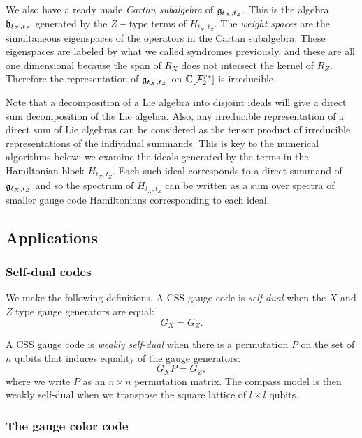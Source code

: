 We also have a ready made \emph{Cartan subalgebra} of $\mathfrak{g}_{t_X,t_Z}.$ 
This is the algebra $\mathfrak{h}_{t_X,t_Z}$ generated by the $Z-$type terms of $H_{t_X,t_Z}.$
The \emph{weight spaces} are the simultaneous eigenspaces
of the operators in the Cartan subalgebra. These
eigenspaces are labeled by what we called syndromes previously,
and these are all one dimensional because the span of $R_X$ does
not intersect the kernel of $R_Z.$
Therefore the representation of 
$\mathfrak{g}_{t_X,t_Z}$ on $\mathbb{C}[\mathcal{F}_2^{r*}]$ is irreducible.

Note that a decomposition of a Lie algebra
into disjoint ideals will give a direct sum decomposition of
the Lie algebra.
Also, any irreducible representation of a direct sum of Lie algebras can
be considered as the tensor product of irreducible representations of the
individual summands.
This is key to the numerical algorithms below:
we examine the ideals generated by
the terms in the Hamiltonian block $H_{t_X,t_Z}.$
Each such ideal corresponds to a direct summand of $\mathfrak{g}_{t_X,t_Z}$ 
and so the spectrum of  $H_{t_X,t_Z}$
can be written as a sum over spectra of smaller gauge code Hamiltonians
corresponding to each ideal.


\subsection{Applications}

\subsubsection{Self-dual codes}

We make the following definitions.
A CSS gauge code is \emph{self-dual} when the $X$ and $Z$ type
gauge generators are equal: $$G_X = G_Z.$$

A CSS gauge code is \emph{weakly self-dual}
when there is a permutation $P$ on the set of $n$ qubits
that induces equality of the gauge generators:
$$
    G_X P = G_Z,
$$
where we write $P$ as an $n\times n$ permutation matrix.
The compass model is then weakly self-dual when we transpose
the square lattice of $l\times l$ qubits.


\subsubsection{The gauge color code}

